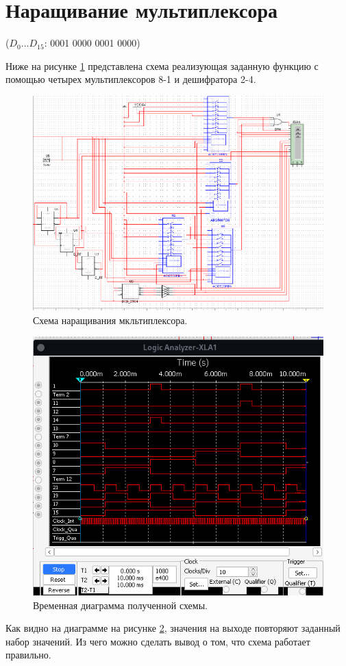 \clearpage

\section{Наращивание мультиплексора}

($D_{0}...D_{15}$: 0001 0000 0001 0000)

Ниже на рисунке \ref{7} представлена схема реализующая заданную функцию с помощью четырех мультиплексоров 8-1 и дешифратора 2-4.

\begin{figure}[ht]
    \centering
    \includegraphics[width=\linewidth]{img/7.png}
    \caption{Схема наращивания мкльтиплексора.}
    \label{7}
\end{figure}

\begin{figure}[ht]
    \centering
    \includegraphics[width=\linewidth]{img/8.png}
    \caption{Временная диаграмма полученной схемы.}
    \label{8}
\end{figure}

Как видно на диаграмме на рисунке \ref{8}, значения на выходе повторяют заданный набор значений. Из чего можно сделать вывод о том, что схема работает правильно.
